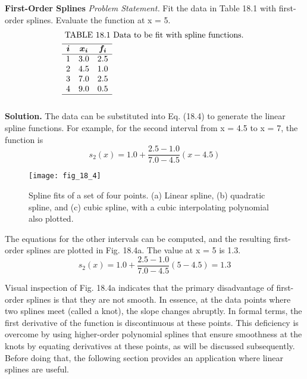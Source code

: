 \documentclass[../main.tex]{subfiles}
\begin{document}
\begin{exmp} \textbf{First-Order Splines}
    \noindent\textit{Problem Statement.} Fit the data in Table 18.1 with first-order splines. Evaluate the
    function at x = 5.
    \begin{equation}
        \begin{aligned}
        &\text { TABLE 18.1 Data to be fit with spline functions. }\\
        &\begin{array}{ccc}
        \hline \boldsymbol{i} & \boldsymbol{x}_{\boldsymbol{i}} & \boldsymbol{f}_{\boldsymbol{i}} \\
        \hline 1 & 3.0 & 2.5 \\
        2 & 4.5 & 1.0 \\
        3 & 7.0 & 2.5 \\
        4 & 9.0 & 0.5 \\
        \hline
        \nonumber
        \end{array}
        \end{aligned}
        \end{equation}
        \noindent \textbf{Solution.} The data can be substituted into Eq. (18.4) to generate the linear spline
        functions. For example, for the second interval from x = 4.5 to x = 7, the function is
        \begin{equation}
            s_{2}(x)=1.0+\frac{2.5-1.0}{7.0-4.5}(x-4.5) \nonumber
            \end{equation}

            \begin{figure}[H]
                \centering
                \texttt{[image: fig\_18\_4]}
               \caption{\textsf{Spline fits of a set of four points. (a) Linear spline, (b) quadratic spline, and (c) cubic spline, with
               a cubic interpolating polynomial also plotted.}}\label{fig:fig_18_4}
            \end{figure}
            The equations for the other intervals can be computed, and the resulting first-order splines
are plotted in Fig. 18.4a. The value at x = 5 is 1.3.
\begin{equation}
    s_{2}(x)=1.0+\frac{2.5-1.0}{7.0-4.5}(5-4.5)=1.3 \nonumber
    \end{equation}

    \end{exmp} 

    Visual inspection of Fig. 18.4a indicates that the primary disadvantage of first-order
splines is that they are not smooth. In essence, at the data points where two splines meet
(called a knot), the slope changes abruptly. In formal terms, the first derivative of the function is discontinuous at these points. This deficiency is overcome by using higher-order
polynomial splines that ensure smoothness at the knots by equating derivatives at these
points, as will be discussed subsequently. Before doing that, the following section provides
an application where linear splines are useful.
\end{document}
